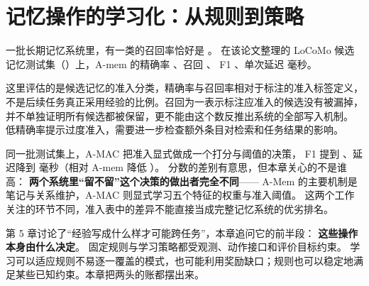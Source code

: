 \chapter{记忆操作的学习化：从规则到策略}
\label{ch06}


\begin{failurebox}
一批长期记忆系统里，有一类的召回率恰好是 。
在该论文整理的 LoCoMo 候选记忆测试集（）上，A-mem 的精确率 、召回 、
F1 、单次延迟  毫秒\cite{amac-2603}。

这里评估的是候选记忆的准入分类，精确率与召回率相对于标注的准入标签定义，
不是后续任务真正采用经验的比例。召回为一表示标注应准入的候选没有被漏掉，
并不单独证明所有候选都被保留，更不能由这个数反推出系统的全部写入机制。
低精确率提示过度准入，需要进一步检查额外条目对检索和任务结果的影响。


同一批测试集上，A-MAC 把准入显式做成一个打分与阈值的决策，
F1 提到 、延迟降到  毫秒（相对 A-mem 降低 ）\cite{amac-2603}。
分数的差别有意思，但本章关心的不是谁高：
\textbf{两个系统里“留不留”这个决策的做出者完全不同}——
A-Mem 的主要机制是笔记与关系维护，A-MAC 则显式学习五个特征的权重与准入阈值。
这两个工作关注的环节不同，准入表中的差异不能直接当成完整记忆系统的优劣排名。
\end{failurebox}


第 5 章讨论了“经验写成什么样才可能跨任务”，本章追问它的前半段：
\textbf{这些操作本身由什么决定}。
固定规则与学习策略都受观测、动作接口和评价目标约束。
学习可以适应规则不易逐一覆盖的模式，也可能利用奖励缺口；规则也可以稳定地满足某些已知约束。本章把两头的账都摆出来。

